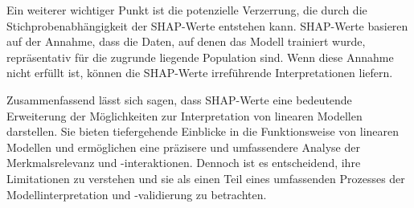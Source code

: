 Ein weiterer wichtiger Punkt ist die potenzielle Verzerrung, die durch die Stichprobenabhängigkeit 
der SHAP-Werte entstehen kann. SHAP-Werte basieren auf der Annahme, dass die Daten, auf denen
das Modell trainiert wurde, repräsentativ für die zugrunde liegende Population sind. 
Wenn diese Annahme nicht erfüllt ist, können die SHAP-Werte irreführende Interpretationen liefern.

Zusammenfassend lässt sich sagen, dass SHAP-Werte eine bedeutende Erweiterung der Möglichkeiten
zur Interpretation von linearen Modellen darstellen. Sie bieten tiefergehende Einblicke in die 
Funktionsweise von linearen Modellen und ermöglichen eine präzisere und umfassendere Analyse der Merkmalsrelevanz 
und -interaktionen. Dennoch ist es entscheidend, ihre Limitationen zu verstehen und sie als 
einen Teil eines umfassenden Prozesses der Modellinterpretation und -validierung zu betrachten. 